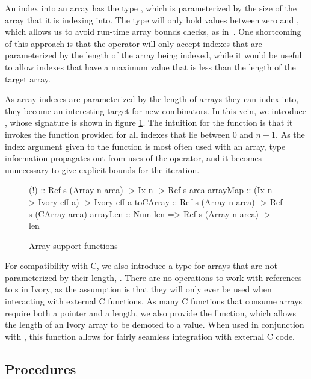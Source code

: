 An index into an array has the type , which is parameterized by the size
of the array that it is indexing into.  The  type will only hold
values between zero and , which allows us to avoid run-time array bounds
checks, as in~\cite{memareas}.  One shortcoming of this approach is that the
\cd{(!)} operator will only accept indexes that are parameterized by the length
of the array being indexed, while it would be useful to allow indexes that have
a maximum value that is less than the length of the target array.

As array indexes are parameterized by the length of arrays they can index into,
they become an interesting target for new combinators.  In this vein, we
introduce , whose signature is shown in figure
\ref{array-support-functions}.  The intuition for the  function is
that it invokes the function provided for all indexes that lie between $0$ and
$n - 1$.  As the index argument given to the function is most often used with an
array, type information propagates out from uses of the \cd{(!)} operator, and
it becomes unnecessary to give explicit bounds for the iteration.

\begin{figure}[h]
\begin{code}
(!)      :: Ref s (Array n area) -> Ix n -> Ref s area
arrayMap :: (Ix n -> Ivory eff a) -> Ivory eff a
toCArray :: Ref s (Array n area) -> Ref s (CArray area)
arrayLen :: Num len => Ref s (Array n area) -> len
\end{code}
\caption{Array support functions}
\label{array-support-functions}
\end{figure}

For compatibility with C, we also introduce a type for arrays that are not
parameterized by their length, .  There are no operations to work
with references to s in Ivory, as the assumption is that they will
only ever be used when interacting with external C functions.  As many C
functions that consume arrays require both a pointer and a length, we also
provide the  function, which allows the length of an Ivory array to
be demoted to a value.  When used in conjunction with , this
function allows for fairly seamless integration with external C code.

\subsection{Procedures}
\label{sec:proc}

